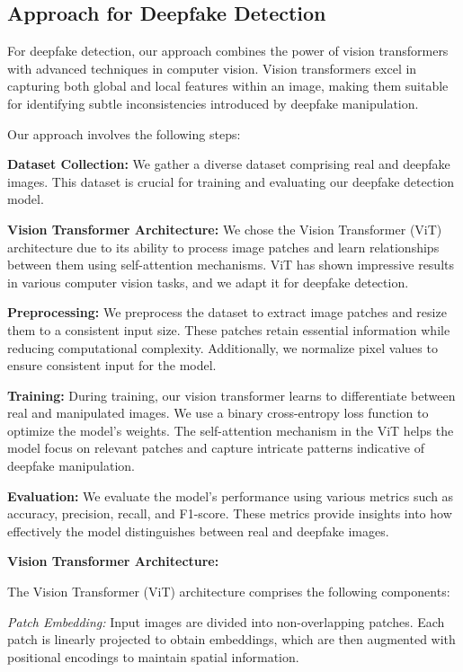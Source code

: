 \subsection{Approach for Deepfake Detection}

For deepfake detection, our approach combines the power of vision transformers with advanced techniques in computer vision. Vision transformers excel in capturing both global and local features within an image, making them suitable for identifying subtle inconsistencies introduced by deepfake manipulation.

Our approach involves the following steps:

\textbf{Dataset Collection:} We gather a diverse dataset comprising real and deepfake images. This dataset is crucial for training and evaluating our deepfake detection model.

\textbf{Vision Transformer Architecture:} We chose the Vision Transformer (ViT) architecture due to its ability to process image patches and learn relationships between them using self-attention mechanisms. ViT has shown impressive results in various computer vision tasks, and we adapt it for deepfake detection.

\textbf{Preprocessing:} We preprocess the dataset to extract image patches and resize them to a consistent input size. These patches retain essential information while reducing computational complexity. Additionally, we normalize pixel values to ensure consistent input for the model.

\textbf{Training:} During training, our vision transformer learns to differentiate between real and manipulated images. We use a binary cross-entropy loss function to optimize the model's weights. The self-attention mechanism in the ViT helps the model focus on relevant patches and capture intricate patterns indicative of deepfake manipulation.

\textbf{Evaluation:} We evaluate the model's performance using various metrics such as accuracy, precision, recall, and F1-score. These metrics provide insights into how effectively the model distinguishes between real and deepfake images.

\textbf{Vision Transformer Architecture:}

The Vision Transformer (ViT) architecture comprises the following components:

\textit{Patch Embedding:} Input images are divided into non-overlapping patches. Each patch is linearly projected to obtain embeddings, which are then augmented with positional encodings to maintain spatial information.

